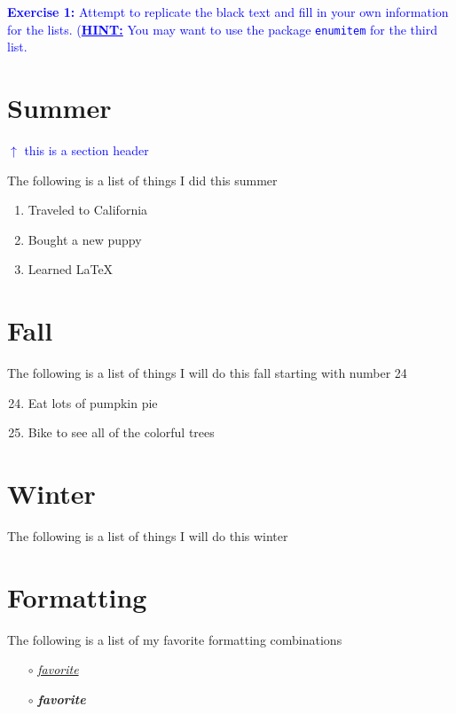 \documentclass[]{article}
\newcommand{\Jeff}[1]{\textcolor{blue}{#1}}
\begin{document}
\noindent \Jeff{\textbf{Exercise 1:} Attempt to replicate the black text and fill in your own information for the lists.
(\textbf{\underline{HINT:}} You may want to use the package \texttt{enumitem} for the third list.}

\section{Summer}
\label{sec:summer}
\Jeff{$\uparrow$ this is a section header}

\noindent The following is a list of things I did this summer
\begin{enumerate}
	\item Traveled to California
	\item Bought a new puppy
	\item Learned \LaTeX\
\end{enumerate}

\section{Fall}
\label{sec:fall}
The following is a list of things I will do this fall starting with number 24
\begin{enumerate}
	\setcounter{enumi}{23}
	\item Eat lots of pumpkin pie
	\item Bike to see all of the colorful trees

\end{enumerate}

\section{Winter}
\label{sec:winter}
The following is a list of things I will do this winter

\section{Formatting}
\label{sec:formatting}
The following is a list of my favorite formatting combinations
\begin{itemize}
	\item[$\circ$] \underline{\textit{favorite}}
	\item[$\circ$] \textbf{\textit{favorite}}
\end{itemize}
\end{document}
